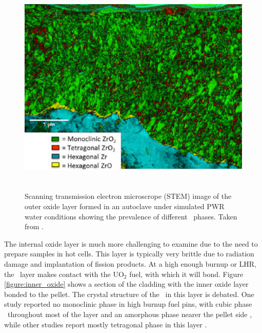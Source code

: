 \begin{figure}[ht]
\centering
\includegraphics[height=10.5cm]{images/outer_oxide.png}
\caption[Scanning transmission electron microscrope (STEM) image of the outer oxide layer formed in an autoclave under simulated PWR water conditions showing the prevalence of different \zirconia\ phases.]{Scanning transmission electron microscrope (STEM) image of the outer oxide layer formed in an autoclave under simulated PWR water conditions showing the prevalence of different \zirconia\ phases. Taken from \cite{Hu2016}.}
\label{figure:outer_oxide}
\end{figure}

The internal oxide layer is much more challenging to examine due to the need to prepare samples in hot cells. This layer is typically very brittle due to radiation damage and implantation of fission products. At a high enough burnup or LHR, the \zirconia\ layer makes contact with the UO$_{2}$ fuel, with which it will bond. Figure \ref{figure:inner_oxide} shows a section of the cladding with the inner oxide layer bonded to the pellet. The crystal structure of the \zirconia\ in this layer is debated. One study reported no monoclinic phase in high burnup fuel pins, with cubic phase \zirconia\ throughout most of the layer and an amorphous phase nearer the pellet side \cite{Nogita1997}, while other studies report mostly tetragonal phase in this layer \cite{ciszak2017etude, gibert1998influence}. 

